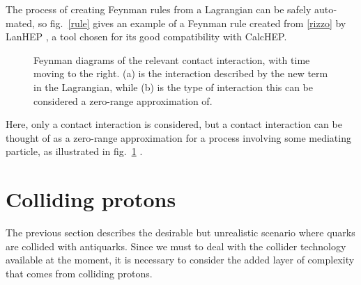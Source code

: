 \begin{english}
The process of creating Feynman rules from a Lagrangian can be safely automated, so fig.~\ref{rule} gives an example of a Feynman rule created from \eqref{rizzo} by LanHEP \cite{lanhep}, a tool chosen for its good compatibility with CalcHEP.

\begin{figure}[htb]
\parbox[t]{.45\textwidth}{\begin{center}\begin{footnotesize}
\end{footnotesize}\end{center}
}\hfill
\parbox[t]{.45\textwidth}{\begin{center}\begin{footnotesize}
\end{footnotesize}\end{center}
}\hfill
\caption{Feynman diagrams of the relevant contact interaction, with time moving to the right. (a) is the interaction described by the new term in the Lagrangian, while (b) is the type of interaction this can be considered a zero-range approximation of.\label{feyns}}
\end{figure}

Here, only a contact interaction is considered, but a contact interaction can be thought of as a zero-range approximation for a process involving some mediating particle, as illustrated in fig.~\ref{feyns} \cite{marshaw:zerorange}.

\section{Colliding protons}
The previous section describes the desirable but unrealistic scenario where quarks are collided with antiquarks. Since we must to deal with the collider technology available at the moment, it is necessary to consider the added layer of complexity that comes from colliding protons.


\end{english}
